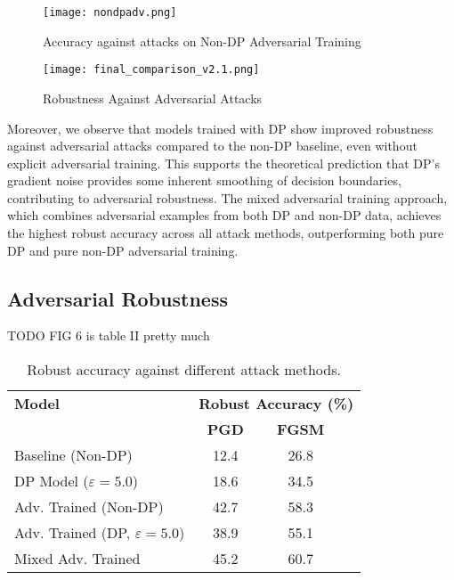 \documentclass[11pt, conference]{IEEEtran}
\begin{document}
\begin{figure}[h]
    \centering
    \texttt{[image: nondpadv.png]} 
    \caption{Accuracy against attacks on Non-DP Adversarial Training}
    \label{fig:nondpadv}
\end{figure}




\begin{figure}
    \centering
    \texttt{[image: final\_comparison\_v2.1.png]}
    \caption{Robustness Against Adversarial Attacks}
    \label{fig:final_comparison}
\end{figure}


Moreover, we observe that models trained with DP show improved robustness against adversarial attacks compared to the non-DP baseline, even without explicit adversarial training. This supports the theoretical prediction that DP's gradient noise provides some inherent smoothing of decision boundaries, contributing to adversarial robustness.
The mixed adversarial training approach, which combines adversarial examples from both DP and non-DP data, achieves the highest robust accuracy across all attack methods, outperforming both pure DP and pure non-DP adversarial training.

\subsection{Adversarial Robustness}

\begin{table}[H]
    \centering
    TODO FIG 6 is table II pretty much
    \begin{tabular}{lccc}
        \toprule
        \textbf{Model} & \multicolumn{3}{c}{\textbf{Robust Accuracy (\%)}} \\
        \cmidrule(lr){2-4}
        & \textbf{PGD} & \textbf{FGSM} \\
        \midrule
        Baseline (Non-DP) & 12.4 & 26.8  \\
        DP Model ($\varepsilon = 5.0$) & 18.6 & 34.5 \\
        Adv. Trained (Non-DP) & 42.7 & 58.3 \\
         Adv. Trained (DP, $\varepsilon = 5.0$) & 38.9 & 55.1 \\
        Mixed Adv. Trained & 45.2 & 60.7  \\
        \bottomrule
    \end{tabular}
    \caption{Robust accuracy against different attack methods.}
    \label{tab:robust_accuracy}
\end{table}
\end{document}
